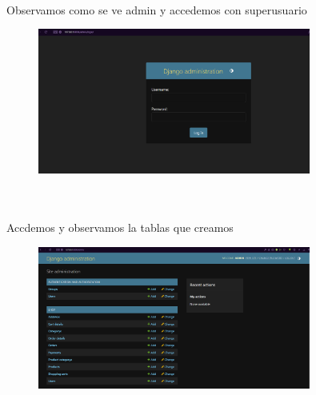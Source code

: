 \documentclass{article}
\begin{document}
\\Observamos como se ve admin y accedemos con superusuario

    \begin{figure}[H]
		          \centering
		          \includegraphics[width=0.8\textwidth,keepaspectratio]                       {img/login.png}
    \end{figure}

\\

\\Accdemos y observamos la tablas que creamos

    \begin{figure}[H]
		          \centering
		          \includegraphics[width=0.8\textwidth,keepaspectratio]                       {img/djadmin.png}
    \end{figure}    
\\
\end{document}
